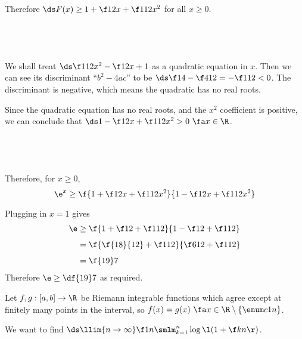 \documentclass[a4paper]{article}
\begin{document}

Therefore $\ds F(x) \ge 1 + \f12 x + \f1{12} x^2$ for all $x \ge 0$.

\subsection{~}

We shall treat $\ds \f1{12} x^2 - \f12 x + 1$ as a quadratic equation in $x$. Then we can see its discriminant \enquote{$b^2 - 4ac$} to be $\ds \f14 - \f4{12} = -\f1{12} < 0$. The discriminant is negative, which means the quadratic has no real roots.

Since the quadratic equation has no real roots, and the $x^2$ coefficient is positive, we can conclude that $\ds 1 - \f12 x + \f1{12} x^2 > 0\ \fa x \in \R$.

\subsection{~}


Therefore, for $x \ge 0$, $$\e^x \ge \f{1 + \f12 x + \f1{12} x^2}{1 - \f12 x + \f1{12} x^2}$$

Plugging in $x=1$ gives \begin{align*}
\e &\ge \f{1 + \f12 + \f1{12}}{1 - \f12 + \f1{12}}\\[1ex]
&= \f{\f{18}{12} + \f1{12}}{\f6{12} + \f1{12}}\\[1ex]
&= \f{19}7
\end{align*}
Therefore $\e \ge \df{19}7$ as required.



Let $f, g : [a, b] \to \R$ be Riemann integrable functions which agree except at finitely many points in the interval, so $f(x) = g(x) \ \fa x \in \R \setminus \{\enum c1n\}$.




We want to find $\ds \llim{n \to \infty} \f1n \smlm_{k=1}^n \log \l( 1 + \f kn \r)$.

\end{document}
